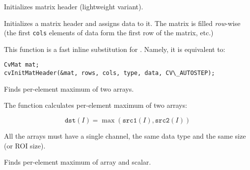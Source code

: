 \ifC
{}
Initializes matrix header (lightweight variant).


\begin{description}
\end{description}

Initializes a matrix header and assigns data to it. The matrix is filled \textit{row}-wise (the first \texttt{cols} elements of data form the first row of the matrix, etc.)

This function is a fast inline substitution for . Namely, it is equivalent to:

\begin{lstlisting}
CvMat mat;
cvInitMatHeader(&mat, rows, cols, type, data, CV\_AUTOSTEP);
\end{lstlisting}
\fi

Finds per-element maximum of two arrays.


\begin{description}
\end{description}

The function calculates per-element maximum of two arrays:

\[
\texttt{dst}(I)=\max(\texttt{src1}(I), \texttt{src2}(I))
\]

All the arrays must have a single channel, the same data type and the same size (or ROI size).


Finds per-element maximum of array and scalar.


\begin{description}
\end{description}

